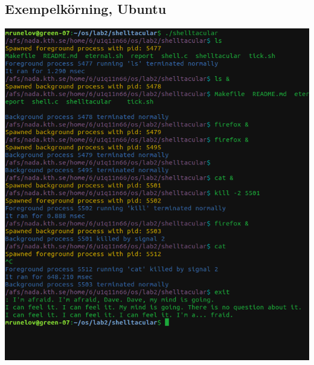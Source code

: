 \documentclass[paper=a4, fontsize=11pt]{scrartcl} %
\numberwithin{equation}{section} %
\numberwithin{figure}{section} %
\numberwithin{table}{section} %
\begin{document}
\subsection*{Exempelkörning, Ubuntu}
\centerline{\includegraphics[scale=0.8]{"shelltacular"}}

\newpage
\end{document}
